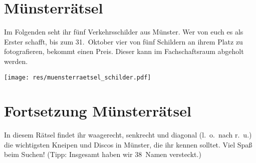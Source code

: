 \section{Münsterrätsel}
Im Folgenden seht ihr fünf Verkehrsschilder aus Münster.
Wer von euch es als Erster schafft, bis zum 31.~Oktober vier von fünf Schildern an ihrem Platz zu fotografieren, bekommt einen Preis.
Dieser kann im Fachschaftsraum abgeholt werden.

\begin{center}
	\texttt{[image: res/muensterraetsel\_schilder.pdf]}
\end{center}

\section*{Fortsetzung Münsterrätsel}
In diesem Rätsel findet ihr waagerecht, senkrecht und diagonal (l.\ o.\ nach r.\ u.) die wichtigsten Kneipen und Discos in Münster, die ihr kennen solltet.
Viel Spaß beim Suchen! (Tipp: Insgesamt haben wir 38~Namen versteckt.)
